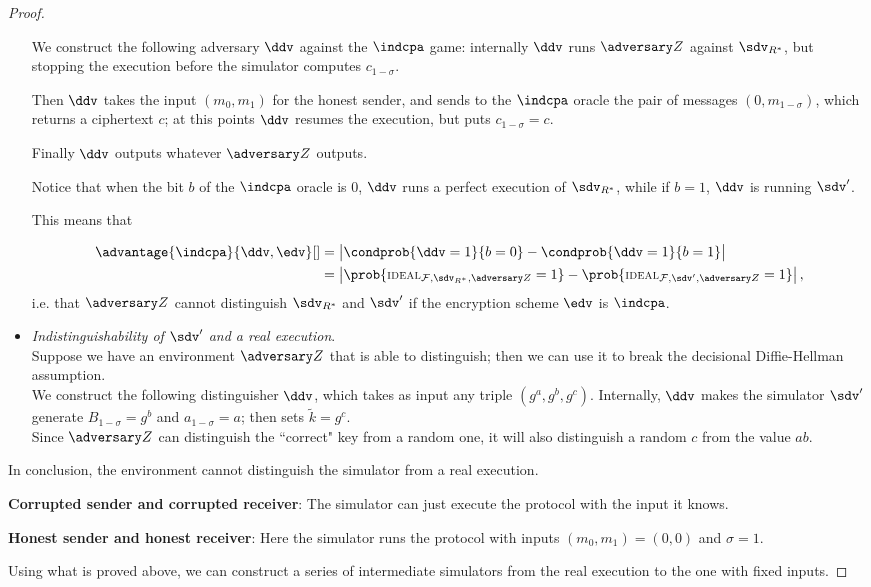 \begin{proof}
\begin{itemize}
        We construct the following adversary $\ddv$ against the $\indcpa$ game: internally $\ddv$ runs $\zdv$ against $\sdv_{R^\ast}$, but stopping the execution before the simulator computes $c_{1-\sigma}$.
        
        Then $\ddv$ takes the input $(m_0,m_1)$ for the honest sender, and sends to the $\indcpa$ oracle the pair of messages $(0,m_{1-\sigma})$, which returns a ciphertext $c$; at this points $\ddv$ resumes the execution, but puts $c_{1-\sigma}=c$.
        
        Finally $\ddv$ outputs whatever $\zdv$ outputs.
        
        Notice that when the bit $b$ of the $\indcpa$ oracle is $0$, $\ddv$ runs a perfect execution of $\sdv_{R^\ast}$, while if $b=1$, $\ddv$ is running $\sdv'$.
        
        This means that
        
        \begin{align*}
        \advantage{\indcpa}{\ddv,\edv}[] &= \left| \condprob{\ddv=1}{b=0} -  \condprob{\ddv=1}{b=1}\right|\\
        & = \left| \prob{\textsc{\scriptsize IDEAL}_{\Fun,\sdv_{R^\ast},\zdv}=1} - \prob{\textsc{\scriptsize IDEAL}_{\Fun,\sdv',\zdv}=1} \right|,
        \end{align*}
        i.e. that $\zdv$ cannot distinguish $\sdv_{R^\ast}$ and $\sdv'$ if the encryption scheme $\edv$ is $\indcpa$.
        
        \item \textit{Indistinguishability of $\sdv'$ and a real execution}.\\
        Suppose we have an environment $\zdv$ that is able to distinguish; then we can use it to break the decisional Diffie-Hellman assumption.\\
        We construct the following distinguisher $\ddv$, which takes as input any triple $(g^a,g^b,g^c)$. Internally, $\ddv$ makes the simulator $\sdv'$ generate $B_{1-\sigma}=g^b$ and $a_{1-\sigma}=a$; then sets $\tilde k=g^c$.\\
        Since $\zdv$ can distinguish the ``correct" key from a random one, it will also distinguish a random $c$ from the value $ab$.
    \end{itemize}

    In conclusion, the environment cannot distinguish the simulator from a real execution.

    \textbf{Corrupted sender and corrupted receiver}: The simulator can just execute the protocol with the input it knows.

    \textbf{Honest sender and honest receiver}: Here the simulator runs the protocol with inputs $(m_0,m_1)=(0,0)$ and $\sigma=1$.

    Using what is proved above, we can construct a series of intermediate simulators from the real execution to the one with fixed inputs.
\end{proof}

